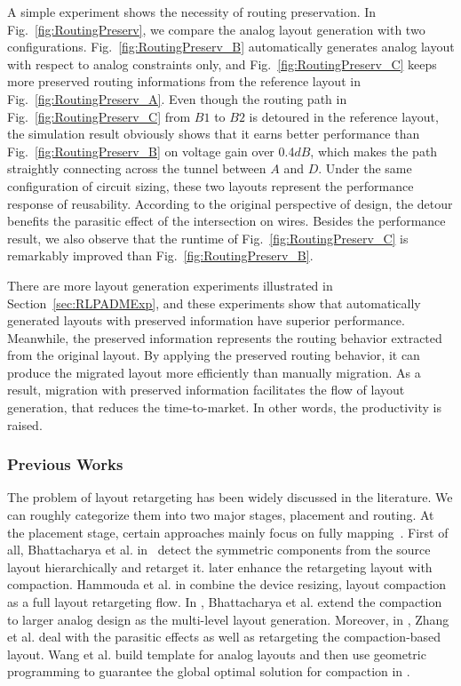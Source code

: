       A simple experiment shows the necessity of routing preservation. In Fig.~\ref{fig:RoutingPreserv}, we compare the analog layout generation with two configurations. Fig.~\ref{fig:RoutingPreserv_B} automatically generates analog layout with respect to analog constraints only, and Fig.~\ref{fig:RoutingPreserv_C} keeps more preserved routing informations from the reference layout in Fig.~\ref{fig:RoutingPreserv_A}. Even though the routing path in Fig.~\ref{fig:RoutingPreserv_C} from $B1$ to $B2$ is detoured in the reference layout, the simulation result obviously shows that it earns better performance than Fig.~\ref{fig:RoutingPreserv_B} on voltage gain over 0.4$dB$, which makes the path straightly connecting across the tunnel between $A$ and $D$. Under the same configuration of circuit sizing, these two layouts represent the performance response of reusability. According to the original perspective of design, the detour benefits the parasitic effect of the intersection on wires. Besides the performance result, we also observe that the runtime of Fig.~\ref{fig:RoutingPreserv_C} is remarkably improved than Fig.~\ref{fig:RoutingPreserv_B}. 
      
      There are more layout generation experiments illustrated in Section~\ref{sec:RLPADMExp}, and these experiments show that automatically generated layouts with preserved information have superior performance. Meanwhile, the preserved information represents the routing behavior extracted from the original layout. By applying the preserved routing behavior, it can produce the migrated layout more efficiently than manually migration. As a result, migration with preserved information facilitates the flow of layout generation, that reduces the time-to-market. In other words, the productivity is raised.

      \subsubsection{Previous Works}

      The problem of layout retargeting has been widely discussed in the literature. We can roughly categorize them into two major stages, placement and routing. At the placement stage, certain approaches mainly focus on fully mapping~\cite{Bhattacharya_ASPDAC04,cbc-bhattacharya-dac04,msc-bhattacharya-tcad06,Zhang_TCAD08,LayoutRetarg_Liu_ASPDAC2010,Wang_ALRGP_TODAES2011}. First of all, Bhattacharya et al. in~\cite{Bhattacharya_ASPDAC04} detect the symmetric components from the source layout hierarchically and retarget it. \cite{cbc-bhattacharya-dac04} later enhance the retargeting layout with compaction. Hammouda et al. in\cite{cart-hammouda-dac06} combine the device resizing, layout compaction as a full layout retargeting flow. In \cite{msc-bhattacharya-tcad06}, Bhattacharya et al. extend the compaction to larger analog design as the multi-level layout generation. Moreover, in \cite{Zhang_TCAD08}, Zhang et al. deal with the parasitic effects as well as retargeting the compaction-based layout. Wang et al. build template for analog layouts and then use geometric programming to guarantee the global optimal solution for compaction in \cite{Wang_ALRGP_TODAES2011}. 

